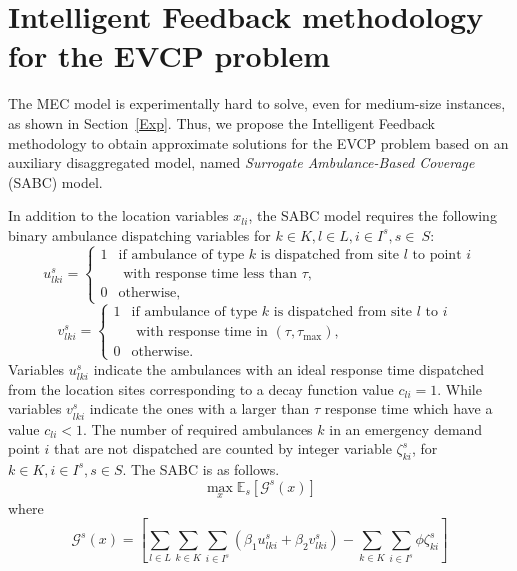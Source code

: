 \section{Intelligent Feedback methodology for the EVCP problem} \label{IF}

The MEC model is experimentally hard to solve, even for medium-size instances, as shown in Section~\ref{Exp}. Thus, we propose the  Intelligent Feedback methodology to obtain approximate solutions for the EVCP problem based on an auxiliary disaggregated model, named \textit{Surrogate Ambulance-Based Coverage} (SABC) model. 

In addition to the location variables $x_{li}$, the SABC model requires the following binary ambulance dispatching variables for $k\in K, l\in L, i\in I^s, s\in~S$: 
\begin{equation*}
       u^s_{lki} = \left\{
       \begin{array}{ll} 
        1 & \text{if ambulance of type $k$ is dispatched from site $l$ 
             to point $i$} \\
          &   \text{ with response time less than $\tau$},\\
         0 & \text{otherwise},
       \end{array} \right.
\end{equation*}
\begin{equation*}
       v^s_{lki} = \left\{
       \begin{array}{ll} 
        1 & \text{if ambulance of type $k$ is dispatched from site $l$ 
             to $i$ }\\
             &   \text{ with response time in $(\tau,\tau_{\max})$},\\
         0 & \text{otherwise}.
       \end{array} \right.
\end{equation*}
Variables $u^s_{lki}$ indicate the ambulances with an ideal response time dispatched from the location sites corresponding to a decay function value $c_{li}=1$. While variables $v^s_{lki}$ indicate the ones with a larger than $\tau$ response time which have a value $c_{li} < 1$. The number of required ambulances $k$ in an emergency demand point $i$ that are not dispatched are counted by integer variable $\zeta^s_{ki}$, for  $k\in K, i\in I^s, s \in S$. The SABC is as follows. 
\begin{equation}
      \max_{x} \mathbb{E}_s [ \mathcal{G}^s(x)]
    \label{eq18}
\end{equation}
where 
\begin{equation*}
    \mathcal{G}^s(x) =  \left[ {\sum_{l \in L} \sum_{k \in K} \sum_{i \in I^s}} (\beta_1 u_{lki}^s + \beta_2 v_{lki}^s) - \sum_{k \in K} \sum_{i \in I^s}  \phi \zeta_{ki}^s \right]
    \label{obj19}
\end{equation*}
